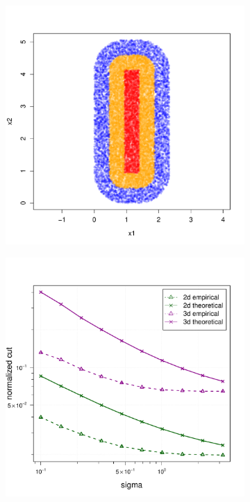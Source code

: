 \documentclass{article}
\newcommand{\1}{\mathbf{1}}
\theoremstyle{aldenthm}
\theoremstyle{aldenrmrk}
\begin{document}
\begin{figure}
\begin{adjustbox}{minipage=\linewidth}
\begin{subfigure}{.33\linewidth}
			\includegraphics[width=\linewidth]{example1plots/sample1}
			\caption{}
		\end{subfigure}
		\begin{subfigure}{.33\linewidth}
			\includegraphics[width=\linewidth]{example1plots/sigma_normalized_cut_plot}
			\caption{}
		\end{subfigure}
		

\end{adjustbox}
\end{figure}
\end{document}
